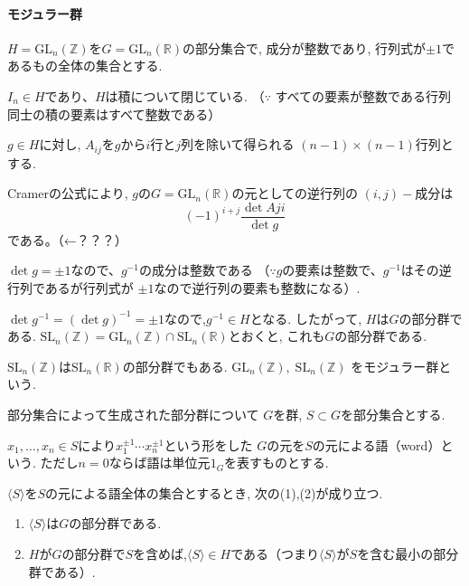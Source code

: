 \paragraph*{モジュラー群}
$H=\mathrm{GL}_n(\mathbb{Z})$を$G=\mathrm{GL}_n(\mathbb{R})$の部分集合で,
成分が整数であり, 行列式が$\pm1$であるもの全体の集合とする.

$I_n \in H $であり、$H$は積について閉じている.
（$\because$ すべての要素が整数である行列同士の積の要素はすべて整数である）

$g \in H$に対し, $A_{ij}$を$g$から$i$行と$j$列を除いて得られる
$(n-1)\times(n-1)$行列とする.

Cramerの公式により, $g$の$G=\mathrm{GL}_n(\mathbb{R})$の元としての逆行列の
$(i,j)-$成分は
\[(-1)^{i+j} \frac{\det A{ji}}{\det g}\]
である。（←？？？）

$\det g = \pm1$なので、$g^{-1}$の成分は整数である
（$\because g$の要素は整数で、$g^{-1}$はその逆行列であるが行列式が
$\pm 1$なので逆行列の要素も整数になる）.

$ \det g^{-1} = (\det g)^{-1}=\pm 1$なので,$g^{-1} \in H$となる.
したがって, $H$は$G$の部分群である.
$\mathrm{SL}_n(\mathbb{Z})=\mathrm{GL}_n(\mathbb{Z}) \cap \mathrm{SL}_n(\mathbb{R})$とおくと, これも$G$の部分群である.\newline

$\mathrm{SL}_n(\mathbb{Z})$は$ \mathrm{SL}_n(\mathbb{R})$の部分群でもある.
$\mathrm{GL}_n(\mathbb{Z}),\; \mathrm{SL}_n(\mathbb{Z})$
をモジュラー群という.\newline

部分集合によって生成された部分群について
$G$を群, $S\subset G$を部分集合とする.

$x_1,\dots,x_n \in S$により$x_1^{\pm 1}\cdots x_n^{\pm 1}$という形をした
$G$の元を$S$の元による語（word）という. 
ただし$n=0$ならば語は単位元$1_G$を表すものとする.

\begin{tcolorbox}
\begin{prp*}
$\langle S \rangle$を$S$の元による語全体の集合とするとき, 次の(1),(2)が成り立つ.
\begin{enumerate}
	\item $\langle S \rangle$は$G$の部分群である.
	\item $H$が$G$の部分群で$S$を含めば,$\langle S \rangle \in H$である（つまり$\langle S \rangle$が$S$を含む最小の部分群である）.
\end{enumerate}
\end{prp*}
\end{tcolorbox}

